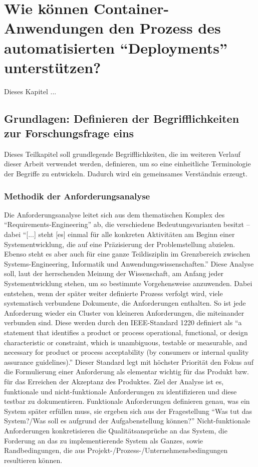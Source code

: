 \chapter[Forschungsfrage 1]{Wie können Container-Anwendungen den Prozess des automatisierten \enquote{Deployments} unterstützen?} \label{ff1}
Dieses Kapitel ...

\section{Grundlagen: Definieren der Begrifflichkeiten zur Forschungsfrage eins}
Dieses Teilkapitel soll grundlegende Begrifflichkeiten, die im weiteren Verlauf dieser Arbeit verwendet werden, definieren, um so eine einheitliche Terminologie der Begriffe zu entwickeln. Dadurch wird ein gemeinsames Verständnis erzeugt.

\subsection{Methodik der Anforderungsanalyse}
Die Anforderungsanalyse leitet sich aus dem thematischen Komplex des \enquote{Requirements-Engineering} ab, die verschiedene Bedeutungsvarianten besitzt -- dabei \enquote{[...] steht [es] einmal für alle konkreten Aktivitäten am Beginn einer Systementwicklung, die auf eine Präzisierung der Problemstellung abzielen. Ebenso steht es aber auch für eine ganze Teildisziplin im Grenzbereich zwischen Systems-Engineering, Informatik und Anwendungswissenschaften.}\autocite[][S.19]{partsch_requirements-engineering_2010} Diese Analyse soll, laut der herrschenden Meinung der Wissenschaft, am Anfang jeder Systementwicklung stehen, um so bestimmte Vorgehensweise anzuwenden. Dabei entstehen, wenn der später weiter definierte Prozess verfolgt wird, viele systematisch verbundene Dokumente, die Anforderungen enthalten. So ist jede Anforderung wieder ein Cluster von kleineren Anforderungen, die miteinander verbunden sind. Diese werden durch den IEEE-Standard 1220 definiert als \enquote{a statement that identifies a product or process operational, functional, or design characteristic or constraint, which is unambiguous, testable or measurable, and necessary for product or process acceptability (by consumers or internal quality assurance guidelines).}\autocite[][S.9]{IEEE1220-2005SystemsEng} Dieser Standard legt mit höchster Priorität den Fokus auf die Formulierung einer Anforderung als elementar wichtig für das Produkt bzw. für das Erreichen der Akzeptanz des Produktes. Ziel der Analyse ist es, funktionale und nicht-funktionale Anforderungen zu identifizieren und diese testbar zu dokumentieren. Funktionale Anforderungen definieren genau, was ein System später erfüllen muss, sie ergeben sich aus der Fragestellung \enquote{Was tut das System?/Was soll es aufgrund der Aufgabenstellung können?}\autocite[][S.27]{partsch_requirements-engineering_2010} Nicht-funktionale Anforderungen konkretisieren die Qualitätsansprüche an das System, die Forderung an das zu implementierende System als Ganzes, sowie Randbedingungen, die aus Projekt-/Prozess-/Unternehmensbedingungen resultieren können.\autocite[vgl.][S.27-29]{partsch_requirements-engineering_2010}

